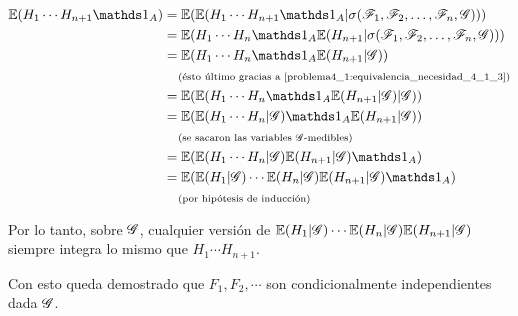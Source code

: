 \begin{itemize}
        \begin{align}
            \E(H_1 \cdots H_{n+1} \indic_A)     &=  \E(\E(H_1 \cdots H_{n+1} \indic_A | \sigma(\F_1, \F_2, \dots, \F_n, \G)))               \\
                                                    &=  \E(H_1 \cdots H_n \indic_A \E(H_{n+1}  | \sigma(\F_1, \F_2, \dots, \F_n, \G)))      \\
                                                    &=  \E(H_1 \cdots H_n \indic_A \E(H_{n+1}  | \G))                                       \\
                                                    &\comment{ésto último gracias a \eqref{problema4_1:equivalencia_necesidad_4_1_3}}       \\
                                                    &=  \E(\E(H_1 \cdots H_n \indic_A \E(H_{n+1}  | \G) | \G))                              \\
                                                    &=  \E(\E(H_1 \cdots H_n | \G) \indic_A \E(H_{n+1}  | \G))                              \\
                                                    &\comment{se sacaron las variables $\G$-medibles}                                       \\
                                                    &=  \E(\E(H_1 \cdots H_n | \G) \E(H_{n+1} | \G) \indic_A)                               \\
                                                    &=  \E(\E(H_1 | \G) \cdots \E(H_n | \G) \E(H_{n+1} | \G) \indic_A)                      \\
                                                    &\comment{por hipótesis de inducción}                                              
        \end{align}
            
        Por lo tanto, sobre $\mathscr{G}$, cualquier versión de $\mathbb{E}(H_1 | \mathscr{G}) \cdots \mathbb{E}(H_n | \mathscr{G}) \mathbb{E}(H_{n+1} | \mathscr{G})$ siempre integra lo mismo que 
        $H_1 \cdots H_{n+1}$.\par\null
\end{itemize}

Con esto queda demostrado que $F_1, F_2, \cdots$ son condicionalmente independientes dada $\mathscr{G}$.
